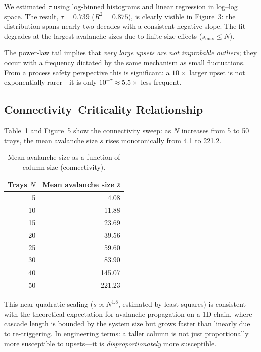 \documentclass[twocolumn,12pt]{article}
\begin{document}
We estimated $\tau$ using log-binned histograms and linear regression in
log--log space.  The result, $\tau = 0.739$ ($R^{2}=0.875$), is clearly
visible in Figure~3: the distribution spans nearly two decades with a
consistent negative slope.  The fit degrades at the largest avalanche
sizes due to finite-size effects ($s_{\max} \leq N$).

The power-law tail implies that \textit{very large upsets are not
improbable outliers}; they occur with a frequency dictated by the same
mechanism as small fluctuations.  From a process safety perspective this
is significant: a $10\times$ larger upset is not exponentially rarer---it
is only $10^{-\tau} \approx 5.5\times$ less frequent.

\subsection{Connectivity--Criticality Relationship}

Table~\ref{tab:conn} and Figure~5 show the connectivity sweep: as $N$
increases from 5 to 50 trays, the mean avalanche size $\bar{s}$ rises
monotonically from 4.1 to 221.2.

\begin{table}[H]
  \centering
  \caption{Mean avalanche size as a function of column size (connectivity).}
  \label{tab:conn}
  \begin{tabular}{rr}
    \toprule
    Trays $N$ & Mean avalanche size $\bar{s}$ \\
    \midrule
      5  &   4.08 \\
     10  &  11.88 \\
     15  &  23.69 \\
     20  &  39.56 \\
     25  &  59.60 \\
     30  &  83.90 \\
     40  & 145.07 \\
     50  & 221.23 \\
    \bottomrule
  \end{tabular}
\end{table}

This near-quadratic scaling ($\bar{s} \propto N^{1.8}$, estimated by
least squares) is consistent with the theoretical expectation for
avalanche propagation on a 1D chain, where cascade length is bounded by
the system size but grows faster than linearly due to re-triggering.  In
engineering terms: a taller column is not just proportionally more
susceptible to upsets---it is \textit{disproportionately} more
susceptible.
\end{document}

